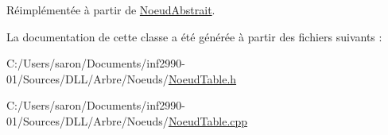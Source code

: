 Réimplémentée à partir de \hyperlink{class_noeud_abstrait}{Noeud\-Abstrait}.



La documentation de cette classe a été générée à partir des fichiers suivants \-:\begin{DoxyCompactItemize}
\item 
C\-:/\-Users/saron/\-Documents/inf2990-\/01/\-Sources/\-D\-L\-L/\-Arbre/\-Noeuds/\hyperlink{_noeud_table_8h}{Noeud\-Table.\-h}\item 
C\-:/\-Users/saron/\-Documents/inf2990-\/01/\-Sources/\-D\-L\-L/\-Arbre/\-Noeuds/\hyperlink{_noeud_table_8cpp}{Noeud\-Table.\-cpp}\end{DoxyCompactItemize}
